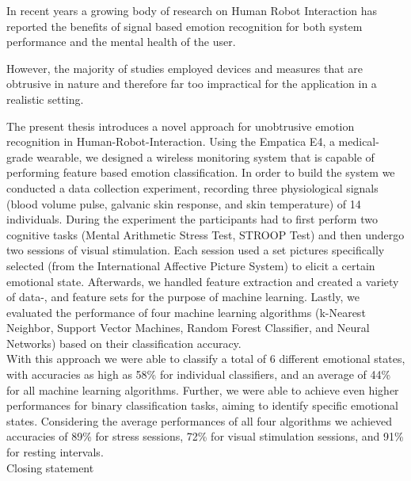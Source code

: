 

In recent years a growing body of research on Human Robot Interaction has reported the benefits of signal based emotion recognition for both system performance and the mental health of the user. 


However, the majority of studies employed devices and measures that are obtrusive in nature and therefore far too impractical for the application in a realistic setting.


The present thesis introduces a novel approach for unobtrusive emotion recognition in Human-Robot-Interaction.  
Using the Empatica E4, a medical-grade wearable, we designed a wireless monitoring system that is capable of performing feature based emotion classification.
In order to build the system we conducted a data collection experiment, recording three physiological signals (blood volume pulse, galvanic skin response, and skin temperature) of 14 individuals. During the experiment the participants had to first perform two cognitive tasks (Mental Arithmetic Stress Test, STROOP Test) and then undergo two sessions of visual stimulation. Each session used a set pictures specifically selected (from the International Affective Picture System) to elicit a certain emotional state.
Afterwards, we handled feature extraction and created a variety of data-, and feature sets for the purpose of machine learning.
Lastly, we evaluated the performance of four machine learning algorithms (k-Nearest Neighbor, Support Vector Machines, Random Forest Classifier, and Neural Networks) based on their classification accuracy.\\
With this approach we were able to classify a total of 6 different emotional states, with accuracies as high as 58\% for individual classifiers, and an average of 44\% for all machine learning algorithms. 
Further, we were able to achieve even higher performances for binary classification tasks, aiming to identify specific emotional states. Considering the average performances of all four algorithms we achieved accuracies of 89\% for stress sessions, 72\% for visual stimulation sessions, and 91\% for resting intervals.\\

 Closing statement